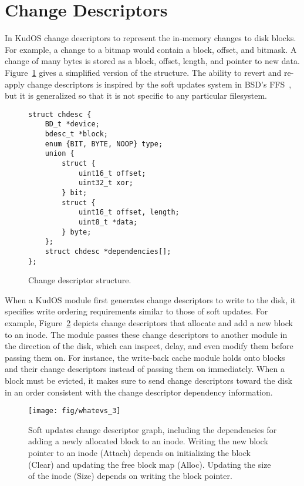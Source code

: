 \preparagraphspacing{}
\section*{Change Descriptors}
\label{sec:chdescs}

In KudOS change descriptors to represent the in-memory changes to disk
blocks. For example, a change to a bitmap would contain a block,
offset, and bitmask. A change of many bytes is stored as a block,
offset, length, and pointer to new data. Figure~\ref{fig:chdesc} gives
a simplified version of the structure. The ability to revert and
re-apply change descriptors is inspired by the soft updates system in
BSD's FFS~\cite{ganger00soft}, but it is generalized so that it is not
specific to any particular filesystem.

\begin{figure}
{\footnotesize
\begin{verbatim}
struct chdesc {
    BD_t *device;
    bdesc_t *block;
    enum {BIT, BYTE, NOOP} type;
    union {
        struct {
            uint16_t offset;
            uint32_t xor;
        } bit;
        struct {
            uint16_t offset, length;
            uint8_t *data;
        } byte;
    };
    struct chdesc *dependencies[];
};
\end{verbatim}
}
\vspace{-14pt}
\caption{\label{fig:chdesc} Change descriptor structure.}
\end{figure}

When a KudOS module first generates change descriptors to write to the disk, it
specifies write ordering requirements similar to those of soft updates. For
example, Figure~\ref{fig:softupdates} depicts change descriptors that allocate
and add a new block to an inode.
%
The module passes these change descriptors to another module in the direction of
the disk, which can inspect, delay, and even modify them before passing them on.
%
For instance, the write-back cache module holds onto blocks and their change
descriptors instead of passing them on immediately.
%
When a block must be evicted, it makes sure to send change descriptors toward
the disk in an order consistent with the change descriptor dependency
information.

\begin{figure}[b]
  \centering
  \texttt{[image: fig/whatevs\_3]}%
  \caption{\label{fig:softupdates} Soft updates change descriptor graph,
  including the dependencies for adding a newly allocated block to an
  inode. Writing the new block pointer to an inode (Attach) depends on
  initializing the block (Clear) and updating the free block map (Alloc).
  Updating the size of the inode (Size) depends on writing the block
  pointer.}
\end{figure}

